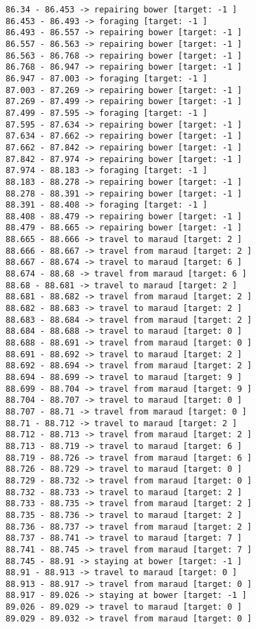 \documentclass[11pt]{article}
\begin{document}
\begin{Verbatim}[commandchars=\\\{\}]
86.34 - 86.453 -> repairing bower [target: -1 ]
86.453 - 86.493 -> foraging [target: -1 ]
86.493 - 86.557 -> repairing bower [target: -1 ]
86.557 - 86.563 -> repairing bower [target: -1 ]
86.563 - 86.768 -> repairing bower [target: -1 ]
86.768 - 86.947 -> repairing bower [target: -1 ]
86.947 - 87.003 -> foraging [target: -1 ]
87.003 - 87.269 -> repairing bower [target: -1 ]
87.269 - 87.499 -> repairing bower [target: -1 ]
87.499 - 87.595 -> foraging [target: -1 ]
87.595 - 87.634 -> repairing bower [target: -1 ]
87.634 - 87.662 -> repairing bower [target: -1 ]
87.662 - 87.842 -> repairing bower [target: -1 ]
87.842 - 87.974 -> repairing bower [target: -1 ]
87.974 - 88.183 -> foraging [target: -1 ]
88.183 - 88.278 -> repairing bower [target: -1 ]
88.278 - 88.391 -> repairing bower [target: -1 ]
88.391 - 88.408 -> foraging [target: -1 ]
88.408 - 88.479 -> repairing bower [target: -1 ]
88.479 - 88.665 -> repairing bower [target: -1 ]
88.665 - 88.666 -> travel to maraud [target: 2 ]
88.666 - 88.667 -> travel from maraud [target: 2 ]
88.667 - 88.674 -> travel to maraud [target: 6 ]
88.674 - 88.68 -> travel from maraud [target: 6 ]
88.68 - 88.681 -> travel to maraud [target: 2 ]
88.681 - 88.682 -> travel from maraud [target: 2 ]
88.682 - 88.683 -> travel to maraud [target: 2 ]
88.683 - 88.684 -> travel from maraud [target: 2 ]
88.684 - 88.688 -> travel to maraud [target: 0 ]
88.688 - 88.691 -> travel from maraud [target: 0 ]
88.691 - 88.692 -> travel to maraud [target: 2 ]
88.692 - 88.694 -> travel from maraud [target: 2 ]
88.694 - 88.699 -> travel to maraud [target: 9 ]
88.699 - 88.704 -> travel from maraud [target: 9 ]
88.704 - 88.707 -> travel to maraud [target: 0 ]
88.707 - 88.71 -> travel from maraud [target: 0 ]
88.71 - 88.712 -> travel to maraud [target: 2 ]
88.712 - 88.713 -> travel from maraud [target: 2 ]
88.713 - 88.719 -> travel to maraud [target: 6 ]
88.719 - 88.726 -> travel from maraud [target: 6 ]
88.726 - 88.729 -> travel to maraud [target: 0 ]
88.729 - 88.732 -> travel from maraud [target: 0 ]
88.732 - 88.733 -> travel to maraud [target: 2 ]
88.733 - 88.735 -> travel from maraud [target: 2 ]
88.735 - 88.736 -> travel to maraud [target: 2 ]
88.736 - 88.737 -> travel from maraud [target: 2 ]
88.737 - 88.741 -> travel to maraud [target: 7 ]
88.741 - 88.745 -> travel from maraud [target: 7 ]
88.745 - 88.91 -> staying at bower [target: -1 ]
88.91 - 88.913 -> travel to maraud [target: 0 ]
88.913 - 88.917 -> travel from maraud [target: 0 ]
88.917 - 89.026 -> staying at bower [target: -1 ]
89.026 - 89.029 -> travel to maraud [target: 0 ]
89.029 - 89.032 -> travel from maraud [target: 0 ]

\end{Verbatim}
\end{document}
